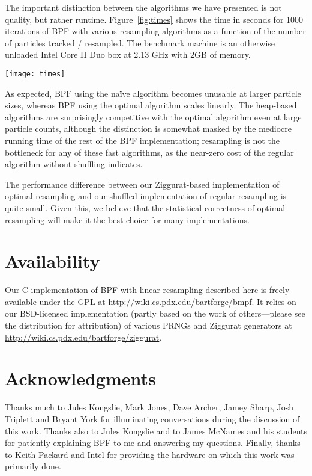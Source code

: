 \documentclass{article}
\begin{document}
  The important distinction between the algorithms we have
  presented is not quality, but rather runtime.
  Figure~\ref{fig:times} shows the time in seconds for 1000
  iterations of BPF with various resampling algorithms as a
  function of the number of particles tracked / resampled.
  The benchmark machine is an otherwise unloaded Intel Core
  II Duo box at 2.13 GHz with 2GB of memory.

  \begin{figure*}[t]
    \centering
    \texttt{[image: times]}
    \caption{Runtimes for BPF Resampling Implementations}\label{fig:times}
  \end{figure*}

  As expected, BPF using the na\"ive algorithm becomes
  unusable at larger particle sizes, whereas BPF using the
  optimal algorithm scales linearly.  The heap-based
  algorithms are surprisingly competitive with the optimal
  algorithm even at large particle counts, although the
  distinction is somewhat masked by the mediocre running
  time of the rest of the BPF implementation; resampling is
  not the bottleneck for any of these fast algorithms, as
  the near-zero cost of the regular algorithm without
  shuffling indicates.

  The performance difference between our
  Ziggurat-based implementation of optimal resampling and
  our shuffled implementation of regular resampling is quite
  small.  Given this, we believe that the statistical
  correctness of optimal resampling will make it the best
  choice for many implementations.

\section{Availability}

  Our C implementation of BPF with linear resampling
  described here is freely available under the GPL at
  \url{http://wiki.cs.pdx.edu/bartforge/bmpf}.  It relies on
  our BSD-licensed implementation (partly based on the work
  of others---please see the distribution for attribution)
  of various PRNGs and Ziggurat generators at
  \url{http://wiki.cs.pdx.edu/bartforge/ziggurat}.

\section{Acknowledgments}

  Thanks much to Jules Kongslie, Mark Jones, Dave Archer,
  Jamey Sharp, Josh Triplett and Bryant York for
  illuminating conversations during the discussion of this
  work.  Thanks also to Jules Kongslie and to James McNames
  and his students for patiently explaining BPF to me and
  answering my questions.  Finally, thanks to Keith Packard
  and Intel for providing the hardware on which this work
  was primarily done.



\end{document}
